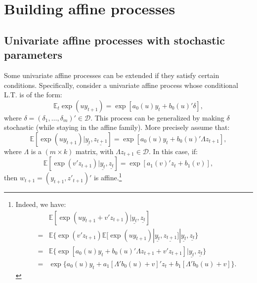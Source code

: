 \documentclass[
  12pt,
]{book}
\theoremstyle{definition}
\theoremstyle{definition}
\theoremstyle{definition}
\theoremstyle{definition}
\theoremstyle{remark}
\begin{document}
\hypertarget{building}{%
\section{Building affine processes}\label{building}}

\hypertarget{stoch}{%
\subsection{Univariate affine processes with stochastic parameters}\label{stoch}}

Some univariate affine processes can be extended if they satisfy certain conditions. Specifically, consider a univariate affine process whose conditional L.T. is of the form:
\begin{equation}
\mathbb{E}_t   \exp(u y_{t+1}) = \exp[a_0(u)y_t+b_0(u)'\delta],\label{eq:extaffine}
\end{equation}
where \(\delta = (\delta_1,\dots,\delta_m)' \in \mathcal{D}\). This process can be generalized by making \(\delta\) stochastic (while staying in the affine family). More precisely assume that:
\[
\mathbb{E}[\exp(u y_{t+1})|\underline{y_t}, \underline{z_{t+1}}] = \exp[a_0(u)y_t+b_0(u)'\Lambda z_{t+1}],
\]
where \(\Lambda\) is a \((m\times k)\) matrix, with \(\Lambda z_{t+1} \in \mathcal{D}\). In this case, if:
\[
\mathbb{E}[\exp(v' z_{t+1})|\underline{y_t}, \underline{z_{t}}] = \exp[a_1(v)'z_t+b_1(v)],
\]
then \(w_{t+1} = (y_{t+1}, z'_{t+1})'\) is affine.\footnote{Indeed, we have:
  \begin{eqnarray*}
  &&\mathbb{E}[\exp(u y_{t+1}+v'z_{t+1})|\underline{y_t}, \underline{z_{t}}] \\
  &=& \mathbb{E}\{\exp(v' z_{t+1})\mathbb{E}[\exp(u y_{t+1})|\underline{y_t},
  \underline{z_{t+1}}]|\underline{y_t}, \underline{z_{t}} \} \\
  &=& \mathbb{E}\{\exp[a_0(u) y_{t}+b_0(u)'\Lambda z_{t+1}+v'z_{t+1}]|\underline{y_t},
  \underline{z_{t}} \} \\
  &=& \exp\{ a_0(u) y_{t}+a_1[\Lambda' b_0(u)+v]'z_t+b_1 [\Lambda' b_0(u)+v]\}.
  \end{eqnarray*}}
\end{document}
